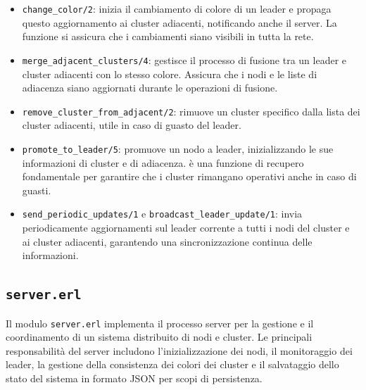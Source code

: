 \documentclass[12pt, a4paper]{report}
\begin{document}
\begin{itemize}
    \item \texttt{change\_color/2}: inizia il cambiamento di colore di un leader e propaga questo aggiornamento ai cluster adiacenti, notificando anche il server. La funzione si assicura che i cambiamenti siano visibili in tutta la rete.

    \item \texttt{merge\_adjacent\_clusters/4}: gestisce il processo di fusione tra un leader e cluster adiacenti con lo stesso colore. Assicura che i nodi e le liste di adiacenza siano aggiornati durante le operazioni di fusione.

    \item \texttt{remove\_cluster\_from\_adjacent/2}: rimuove un cluster specifico dalla lista dei cluster adiacenti, utile in caso di guasto del leader.

    \item \texttt{promote\_to\_leader/5}: promuove un nodo a leader, inizializzando le sue informazioni di cluster e di adiacenza. \`e una funzione di recupero fondamentale per garantire che i cluster rimangano operativi anche in caso di guasti.

    \item \texttt{send\_periodic\_updates/1} e \texttt{broadcast\_leader\_update/1}: invia periodicamente aggiornamenti sul leader corrente a tutti i nodi del cluster e ai cluster adiacenti, garantendo una sincronizzazione continua delle informazioni.

\end{itemize}

\subsection{\texttt{server.erl}}

Il modulo \texttt{server.erl} implementa il processo server per la gestione e il coordinamento di un sistema distribuito di nodi e cluster. Le principali responsabilità del server includono l'inizializzazione dei nodi, il monitoraggio dei leader, la gestione della consistenza dei colori dei cluster e il salvataggio dello stato del sistema in formato JSON per scopi di persistenza.
\end{document}
